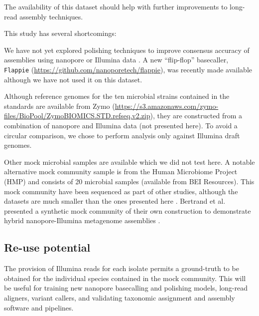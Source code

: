 \documentclass[a4paper,num-refs]{oup-contemporary}
\begin{document}
The availability of this dataset should help with further improvements to long-read assembly techniques.

This study has several shortcomings:

We have not yet explored polishing techniques to improve consensus accuracy of assemblies using nanopore or Illumina data \cite{Rang2018-md}. A new ``flip-flop'' basecaller, \texttt{Flappie} (\url{https://github.com/nanoporetech/flappie}), was recently made available although we have not used it on this dataset.

Although reference genomes for the ten microbial strains contained in the standards are available from Zymo (\url{https://s3.amazonaws.com/zymo-files/BioPool/ZymoBIOMICS.STD.refseq.v2.zip}), they are constructed from a combination of nanopore and Illumina data (not presented here). To avoid a circular comparison, we chose to perform analysis only against Illumina draft genomes. 

Other mock microbial samples are available which we did not test here. A notable alternative mock community sample is from the Human Microbiome Project (HMP) and consists of 20 microbial samples (available from BEI Resources). This mock community have been sequenced as part of other studies, although the datasets are much smaller than the ones presented here \cite{Leggett2017-sx,Huson2018-bh}. Bertrand et al. presented a synthetic mock community of their own construction to demonstrate hybrid nanopore-Illumina metagenome assemblies \cite{Bertrand2018-lz}.

\subsection{Re-use potential}
The provision of Illumina reads for each isolate permits a ground-truth to be obtained for the individual species contained in the mock community. This will be useful for training new nanopore basecalling and polishing models, long-read aligners, variant callers, and validating taxonomic assignment and assembly software and pipelines.

\end{document}
